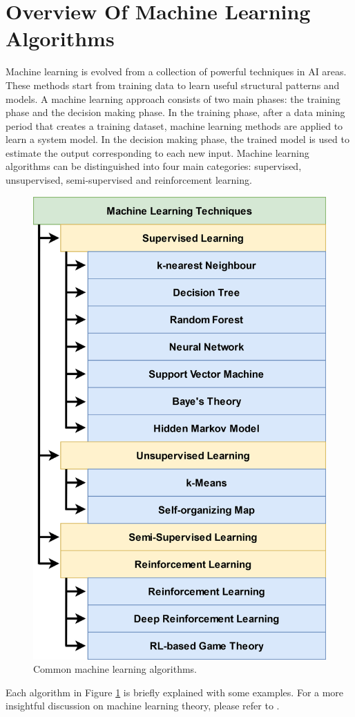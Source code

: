 \section{Overview Of Machine Learning Algorithms} \label{sec:ML_BGK}
Machine learning is evolved from a collection of powerful techniques in AI areas. These methods start from training data to learn useful structural patterns and models. A machine learning approach consists of two main phases: the training phase and the decision making phase. In the training phase, after a data mining period that creates a training dataset, machine learning methods are applied to learn a system model. In the decision making phase, the trained model is used to estimate the output corresponding to each new input.
Machine learning algorithms can be distinguished into four main categories: supervised, unsupervised, semi-supervised and reinforcement learning.
\begin{figure}[tb!]
	\centering
	\includegraphics[scale=0.13]{figure/ML_algo.jpg}
	\caption{Common machine learning algorithms.}
	\label{fig:{ML_algo}}
\end{figure}
Each algorithm in Figure \ref{fig:{ML_algo}} is briefly explained with some examples. For a more insightful discussion on machine learning theory, please refer to \cite{Mohammed2016, Marsland2015, Alpaydin2020}.

